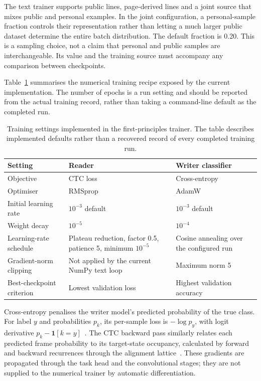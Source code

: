 The text trainer supports public lines, page-derived lines and a joint source that mixes public and personal examples. In the joint configuration, a personal-sample fraction controls their representation rather than letting a much larger public dataset determine the entire batch distribution. The default fraction is 0.20. This is a sampling choice, not a claim that personal and public samples are interchangeable. Its value and the training source must accompany any comparison between checkpoints.

Table~\ref{tab:des-training} summarises the numerical training recipe exposed by the current implementation. The number of epochs is a run setting and should be reported from the actual training record, rather than taking a command-line default as the completed run.

\begin{table}[!htbp]\centering\small
\begin{tabularx}{\linewidth}{|l|X|X|}
\hline\textbf{Setting}&\textbf{Reader}&\textbf{Writer classifier}\\\hline
Objective&CTC loss&Cross-entropy\\\hline
Optimiser&RMSprop&AdamW\\\hline
Initial learning rate&$10^{-3}$ default&$10^{-3}$ default\\\hline
Weight decay&$10^{-5}$&$10^{-4}$\\\hline
Learning-rate schedule&Plateau reduction, factor 0.5, patience 5, minimum $10^{-5}$&Cosine annealing over the configured run\\\hline
Gradient-norm clipping&Not applied by the current NumPy text loop&Maximum norm 5\\\hline
Best-checkpoint criterion&Lowest validation loss&Highest validation accuracy\\\hline
\end{tabularx}
\caption{Training settings implemented in the first-principles trainer. The table describes implemented defaults rather than a recovered record of every completed training run.}
\label{tab:des-training}
\end{table}

Cross-entropy penalises the writer model's predicted probability of the true class. For label $y$ and probabilities $p_k$, its per-sample loss is $-\log p_y$, with logit derivative $p_k-\mathbf{1}[k=y]$~\cite[p.~6]{graves2013}. The CTC backward pass similarly relates each predicted frame probability to its target-state occupancy, calculated by forward and backward recurrences through the alignment lattice~\cite[pp.~4--6]{graves2006}. These gradients are propagated through the task head and the convolutional stages; they are not supplied to the numerical trainer by automatic differentiation.

